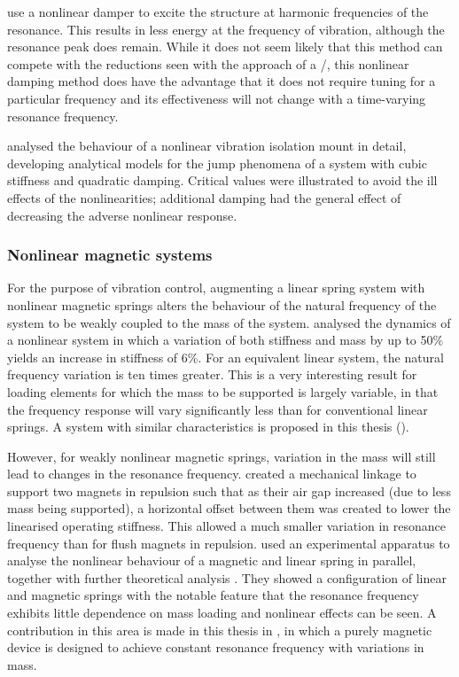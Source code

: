 \documentclass[11pt,a4paper]{memoir}
\begin{document}
\textcite{zhang2008} use a nonlinear damper to excite the structure at harmonic frequencies of the resonance.
This results in less energy at the frequency of vibration, although the resonance peak does remain.
While it does not seem likely that this method can compete with the reductions seen with the approach of a \vibneut/, this nonlinear damping method does have the advantage that it does not require tuning for a particular frequency and its effectiveness will not change with a time-varying resonance frequency.

\textcite{jazar2006} analysed the behaviour of a nonlinear vibration isolation mount in detail, developing analytical models for the jump phenomena of a system with cubic stiffness and quadratic damping.
Critical values were illustrated to avoid the ill effects of the nonlinearities; additional damping had the general effect of decreasing the adverse nonlinear response.

\subsubsection{Nonlinear magnetic systems}

For the purpose of vibration control, augmenting a linear spring system with nonlinear magnetic springs alters the behaviour of the natural frequency of the system to be weakly coupled to the mass of the system.
\textcite{dangola2006} analysed the dynamics of a nonlinear system in which a variation of both stiffness and mass by up to 50\% yields an increase in stiffness of 6\%.
For an equivalent linear system, the natural frequency variation is ten times greater.
This is a very interesting result for loading elements for which the mass to be supported is largely variable, in that the frequency response will vary significantly less than for conventional linear springs.
A system with similar characteristics is proposed in this thesis ().

However, for weakly nonlinear magnetic springs, variation in the mass will still lead to changes in the resonance frequency.
\textcite{todaka2001-ietm} created a mechanical linkage to support two magnets in repulsion such that as their air gap increased (due to less mass being supported), a horizontal offset between them was created to lower the linearised operating stiffness.
This allowed a much smaller variation in resonance frequency than for flush magnets in repulsion.
\textcite{bonisoli2007-mssp} used an experimental apparatus to analyse the nonlinear behaviour of a magnetic and linear spring in parallel, together with further theoretical analysis \cite{bonisoli2007-mrc}.
They showed a configuration of linear and magnetic springs with the notable feature that the resonance frequency exhibits little dependence on mass loading and nonlinear effects can be seen.
A contribution in this area is made in this thesis in , in which a purely magnetic device is designed to achieve constant resonance frequency with variations in mass.
\end{document}
